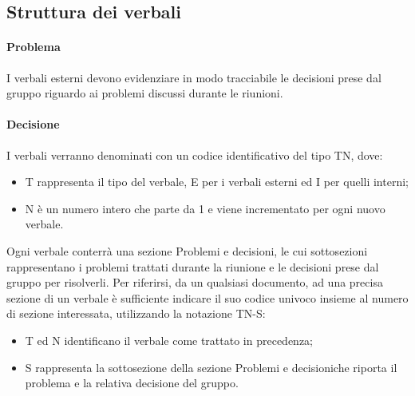 \subsection{Struttura dei verbali}
\paragraph{Problema} I verbali esterni devono evidenziare in modo tracciabile le decisioni prese dal gruppo riguardo ai problemi discussi durante le riunioni.
\paragraph{Decisione} I verbali verranno denominati con un codice identificativo del tipo TN, dove:
\begin{itemize}
\item T rappresenta il tipo del verbale, E per i verbali esterni ed I per quelli interni;
\item N è un numero intero che parte da 1 e  viene incrementato per ogni nuovo verbale.
\end{itemize}
Ogni verbale conterrà una sezione \textquotedbl Problemi e decisioni\textquotedbl, le cui sottosezioni rappresentano i problemi trattati durante la riunione e le decisioni prese dal gruppo per risolverli.
Per riferirsi, da un qualsiasi documento, ad una precisa sezione di un verbale è sufficiente indicare
il suo codice univoco insieme al numero di sezione interessata, utilizzando la notazione TN-S:
\begin{itemize}
\item T ed N identificano il verbale come trattato in precedenza;
\item S rappresenta la sottosezione della sezione \textquotedbl Problemi e decisioni\textquotedbl che riporta il problema e la relativa decisione del gruppo.
\end{itemize}
